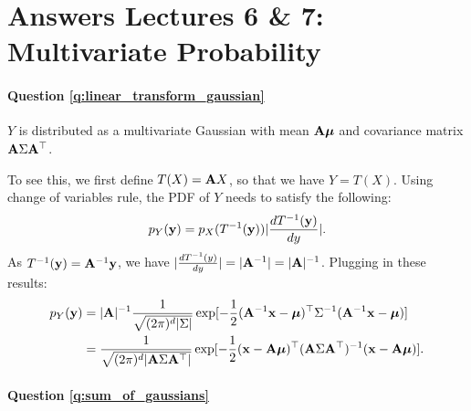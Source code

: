 \section{Answers Lectures 6 \& 7: Multivariate Probability}

\paragraph{Question \ref{q:linear_transform_gaussian}}
$Y$ is distributed as a multivariate Gaussian with mean $\mathbf A \bm{\mu}$ and covariance matrix $\mathbf A \Sigma \mathbf A^\top$.

To see this, we first define $T(X) = \mathbf A X$, so that we have $Y = T(X)$. Using change of variables rule, the PDF of $Y$ needs to satisfy the following:
$$p_Y(\mathbf{y}) = p_X(T^{-1}(\mathbf{y})) | \frac{dT^{-1}(\mathbf{y})}{dy} | .$$
As $T^{-1}(\mathbf{y}) = \mathbf A^{-1} \mathbf{y}$, we have $| \frac{dT^{-1}(y)}{dy} | = | \mathbf A^{-1} | = | \mathbf A |^{-1}$. Plugging in these results:
\begin{equation*}
\begin{aligned}
p_Y(\mathbf{y}) &=  |\mathbf A |^{-1} \frac{1}{\sqrt{(2 \pi)^d |\Sigma|}} \exp[-\frac{1}{2} (\mathbf A^{-1} \mathbf{x} - \bm{\mu})^\top \Sigma^{-1} (\mathbf A^{-1} \mathbf{x} - \bm{\mu})] \\
& = \frac{1}{\sqrt{(2 \pi)^d |\mathbf A \Sigma \mathbf A^\top|}} \exp[-\frac{1}{2} (\mathbf{x} - \mathbf A \bm{\mu})^\top (\mathbf A \Sigma \mathbf A^{\top})^{-1} ( \mathbf{x} - \mathbf A \bm{\mu})].
\end{aligned}
\end{equation*}

\paragraph{Question \ref{q:sum_of_gaussians}}

